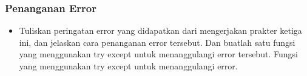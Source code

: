 \subsubsection{Penanganan Error} 
\begin{itemize}
  \item Tuliskan peringatan error yang didapatkan dari mengerjakan prakter ketiga ini, dan jelaskan cara penanganan error tersebut. Dan buatlah satu fungsi yang menggunakan try except untuk menanggulangi error tersebut.
      Fungsi yang menggunakan try except untuk menanggulangi error.


\end{itemize}

